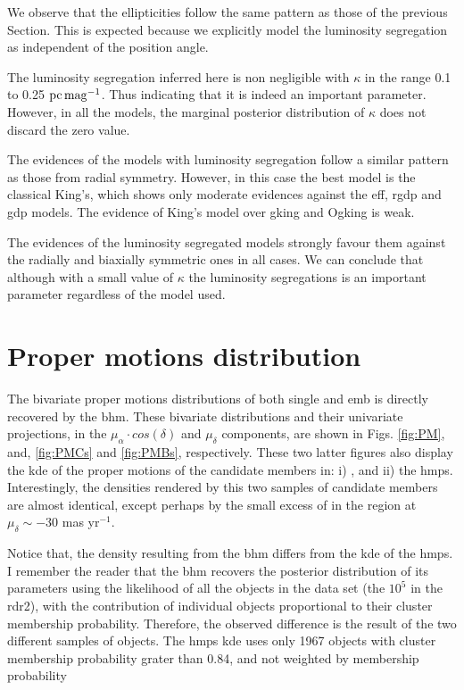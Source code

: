 We observe that the ellipticities follow the same pattern as those of the previous Section. This is expected because we explicitly model the luminosity segregation as independent of the position angle.
   
The luminosity segregation inferred here is non negligible with $\kappa$ in the range 0.1 to 0.25 $\rm{pc}\,\rm{mag}^{-1}$. Thus indicating that it is indeed an important parameter. However, in all the models, the marginal posterior distribution of $\kappa$ does not discard the zero value.

The evidences of the models with luminosity segregation follow a similar pattern as those from radial symmetry. However, in this case the best model is the classical King's, which shows only moderate evidences against the \gls{eff}, \gls{rgdp} and \gls{gdp} models. The evidence of King's model over \gls{gking} and O\gls{gking} is weak.

The evidences of the luminosity segregated models strongly favour them against the radially and biaxially symmetric ones in all cases. We can conclude that although with a small value of $\kappa$ the luminosity segregations is an important parameter regardless of the model used.




\section{Proper motions distribution}
\label{sect:PMresults}
The bivariate proper motions distributions of both single and \gls{emb} is directly recovered by the \gls{bhm}. These bivariate distributions and their univariate projections, in the $\mu_{\alpha}\cdot cos(\delta)$ and $\mu_{\delta}$ components, are shown in Figs. \ref{fig:PM}, and,  \ref{fig:PMCs} and \ref{fig:PMBs}, respectively. These two latter figures also display the \gls{kde} of the proper motions of the candidate members in: i) \citet{Bouy2015}, and ii) the \gls{hmps}. Interestingly, the densities rendered by this two samples of candidate members are almost identical, except perhaps by the small excess of \citet{Bouy2015} in the region at  $\mu_{\delta}\sim -30$ mas yr$^{-1}$. 

Notice that, the density resulting from the \gls{bhm} differs from the \gls{kde} of the \gls{hmps}. I remember the reader that the \gls{bhm} recovers the posterior distribution of its parameters using the likelihood of all the objects in the data set (the $10^5$ in the \gls{rdr2}), with the contribution of individual objects proportional to their cluster membership probability. Therefore, the observed difference is the result of the two different samples of objects. The \gls{hmps} \gls{kde} uses only 1967 objects with cluster membership probability grater than 0.84, and not weighted by membership probability

